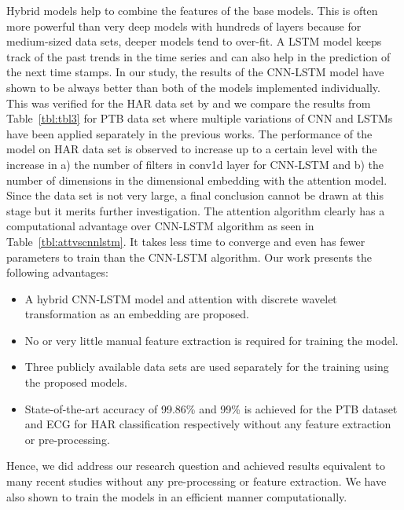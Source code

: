\documentclass{ieeeaccess}
\begin{document}
Hybrid models help to combine the features of the base models. This is often more powerful than very deep models with hundreds of layers because for medium-sized data sets, deeper models tend to over-fit. A LSTM model keeps track of the past trends in the time series and can also help in the prediction of the next time stamps. In our study, the results of the CNN-LSTM model have shown to be always better than both of the models implemented individually. This was verified for the HAR data set by \cite{Pusch} and we compare the results from Table~\ref{tbl:tbl3} for PTB data set where multiple variations of CNN and LSTMs have been applied separately in the previous works.
The performance of the model on HAR data set is observed to increase up to a certain level with the increase in a) the number of filters in conv1d layer for CNN-LSTM and b) the number of dimensions in the dimensional embedding with the attention model. Since the data set is not very large, a final conclusion cannot be drawn at this stage but it merits further investigation. 
The attention algorithm clearly has a computational advantage over CNN-LSTM algorithm as seen in Table~\ref{tbl:attvscnnlstm}. It takes less time to converge and even has fewer parameters to train than the CNN-LSTM algorithm.
Our work presents the following advantages:
\begin{itemize}
  \item A hybrid CNN-LSTM model and attention with discrete wavelet transformation as an embedding are proposed.
  \item No or very little manual feature extraction is required for training the model.
  \item Three publicly available data sets are used separately for the training using the proposed models.
  \item State-of-the-art accuracy of 99.86\% and 99\% is achieved for the PTB dataset and ECG for HAR classification respectively without any feature extraction or pre-processing.

\end{itemize}
Hence, we did address our research question and achieved results equivalent to many recent studies without any pre-processing or feature extraction. We have also shown to train the models in an efficient manner computationally.



\vspace{6pt} 
\end{document}
